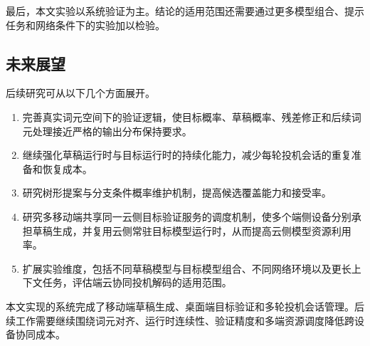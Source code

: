 最后，本文实验以系统验证为主。结论的适用范围还需要通过更多模型组合、提示任务和网络条件下的实验加以检验。

\subsection{未来展望}

后续研究可从以下几个方面展开。

\begin{enumerate}[label=\arabic*.]
  \item 完善真实词元空间下的验证逻辑，使目标概率、草稿概率、残差修正和后续词元处理接近严格的输出分布保持要求。
  \item 继续强化草稿运行时与目标运行时的持续化能力，减少每轮投机会话的重复准备和恢复成本。
  \item 研究树形提案与分支条件概率维护机制，提高候选覆盖能力和接受率。
  \item 研究多移动端共享同一云侧目标验证服务的调度机制，使多个端侧设备分别承担草稿生成，并复用云侧常驻目标模型运行时，从而提高云侧模型资源利用率。
  \item 扩展实验维度，包括不同草稿模型与目标模型组合、不同网络环境以及更长上下文任务，评估端云协同投机解码的适用范围。
\end{enumerate}

本文实现的系统完成了移动端草稿生成、桌面端目标验证和多轮投机会话管理。后续工作需要继续围绕词元对齐、运行时连续性、验证精度和多端资源调度降低跨设备协同成本。
